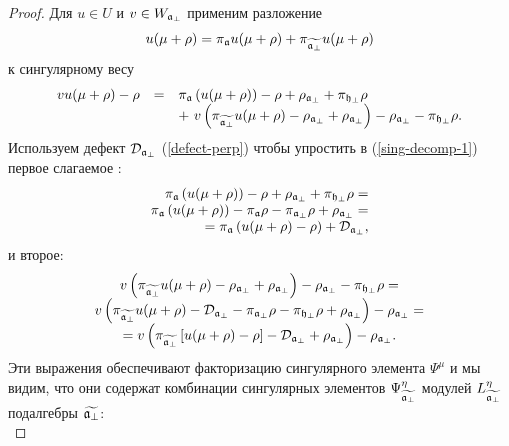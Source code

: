 \begin{proof}
Для $u\in U $ и $v\in W_{\mathfrak{a}_{\perp}}$ применим разложение
\begin{equation*}
u(\mu +\rho )=\pi _{\mathfrak{a} } u(\mu +\rho )+\pi _{
\widetilde{\mathfrak{a}_{\perp }} } u(\mu +\rho )
\end{equation*}
к сингулярному весу
\begin{equation}
\label{sing-decomp-1}
\begin{array}{lcl}
vu(\mu +\rho )-\rho &=&\pi _{ \af }\left( u(\mu +\rho
)\right) -\rho +\rho _{\af_{\perp }}+\pi _{ \hfb }\rho \\
&& + \ v\left( \pi _{ \widetilde{%
\af_{\perp }} }u(\mu +\rho )-\rho _{\af_{\perp }}+\rho _{%
\af_{\perp }}\right) -\rho _{\af_{\perp }} -\pi _{ \hfb }\rho.
\end{array}
\end{equation}
Используем дефект $\mathcal{D}_{\mathfrak{a}_{\perp}}$ (\ref{defect-perp}) чтобы упростить в (\ref{sing-decomp-1}) первое слагаемое :
\begin{equation*}
\begin{array}{r}
\pi _{ \af }\left( u(\mu +\rho )\right) -\rho +\rho _{%
\mathfrak{a}_{\perp }}+\pi _{ \hfb }\rho = \\
\pi _{ \af }\left( u(\mu +\rho )\right) -\pi _{\af}\rho
-\pi _{\afb}\rho +\rho _{\afb}= \\
=\pi _{ \af }\left( u(\mu +\rho )-\rho \right) +%
\mathcal{D}_{\afb},
\end{array}
\end{equation*}
и второе:
\begin{equation*}
\begin{array}{c}
v\left( \pi _{ \widetilde{%
\af_{\perp }} }u(\mu +\rho )-\rho _{\af_{\perp }}+\rho _{%
\af_{\perp }}\right) -\rho _{\af_{\perp }}-\pi _{ \hfb }\rho=\\
v\left( \pi _{ \widetilde{%
\afb} }u(\mu +\rho )
- \mathcal{D}_{\afb} - \pi _{ \afb }\rho-\pi _{ \hfb }\rho
+\rho _{\afb}\right) -\rho _{\afb}=\\
=v\left( \pi _{ \widetilde{%
\afb} }\left[ u(\mu +\rho )-\rho\right]
- \mathcal{D}_{\afb}
+\rho _{\afb}\right) -\rho _{\afb}.
\end{array}
\end{equation*}
Эти выражения обеспечивают факторизацию сингулярного элемента  $\Psi^{\mu}$ и мы видим, что они содержат комбинации сингулярных элементов $\Psi _{\widetilde{\mathfrak{a}_{\perp }}}^{\eta }$ модулей $L_{\widetilde{\mathfrak{a}_{\perp}}}^{\eta }$ подалгебры  $\widetilde{\mathfrak{a}_{\perp}}$:
\begin{equation*}

\end{equation*}
\end{proof}
